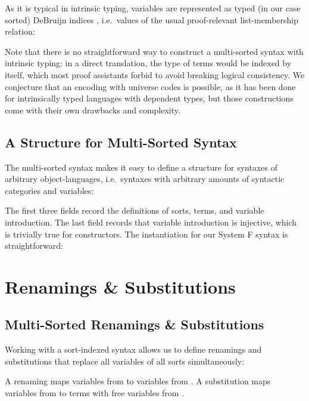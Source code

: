 \documentclass[sigplan,10pt, anonymous]{acmart}
\newenvironment{LibCode*}{%
  \begin{tcolorbox}[%
    colframe=white,%
    boxrule=0.0pt,%
    top=2.5pt,%
    left=2.5pt,%
    bottom=2.5pt,%
    right=2.5pt,%
    boxsep=0pt%
  ]\vspace{-0.2\baselineskip}%
}{%
  \vspace{-1\baselineskip}%
  \end{tcolorbox}%
}
\newenvironment{ExampleCode*}{%
  \begin{tcolorbox}[%
    colframe=white,%
    colback=yellow!5,%
    boxrule=0.0pt,%
    top=2.5pt,%
    left=2.5pt,%
    bottom=2.5pt,%
    right=2.5pt,%
    boxsep=0pt%
  ]\vspace{-0.2\baselineskip}%
}{%
  \vspace{-1\baselineskip}%
  \end{tcolorbox}%
}
\newcommand*\LibCode[1]{\begin{LibCode*}{#1}\end{LibCode*}}
\newcommand*\AppCode[1]{{#1}}
\newcommand*\ExampleCode[1]{\begin{ExampleCode*}{#1}\end{ExampleCode*}}
\newcommand*\ACode[1]{\AgdaFontStyle{\textcolor{mygray}{#1}}}
\newcommand*\AField[1]{\AgdaField{#1}}
\newcommand*\ACon[1]{\AgdaInductiveConstructor{#1}}
\newcommand*\ADef[1]{\AgdaFunction{#1}}
\begin{document}
  As it is typical in intrinsic typing, variables are represented as
  typed (in our case sorted) DeBruijn indices \ACode{S \ACon{∋} s}, i.e.\
  values of the usual proof-relevant list-membership relation:
  \LibCode\KVariables

  Note that there is no straightforward way to construct a
  multi-sorted syntax with intrinsic typing: in a direct translation,
  the type of terms \ACode{\ACon{\_⊢\_}} would be indexed by itself, which
  most proof assistants forbid to avoid breaking logical consistency.
  We conjecture that an encoding with universe codes is possible, as
  it has been done for intrinsically typed languages with dependent
  types, but those constructions come with their own drawbacks and complexity.


  \subsection{A Structure for Multi-Sorted Syntax}
  The multi-sorted syntax makes it easy to define a structure for
  syntaxes of arbitrary object-languages, i.e.\ syntaxes with
  arbitrary amounts of syntactic categories and variables:
  \LibCode\KSyntax
  The first three fields record the definitions of sorts, terms, and variable introduction.
  The last field records that variable introduction
  \ACode{\AField{`\_}} is injective, which is trivially true for
  constructors. The instantiation for our System F syntax is
  straightforward:
  \AppCode\FSyntaxInst

  \section{Renamings \& Substitutions}
  \subsection{Multi-Sorted Renamings \& Substitutions}
  Working with a sort-indexed syntax allows us to define renamings and substitutions
  that replace all variables of all sorts simultaneously:

  \ExampleCode\FExampleSubRen

  A renaming \ACode{S₁ \ADef{→ᵣ} S₂} maps variables from \ACode{S₁} to
  variables from \ACode{S₂}.
  A substitution \ACode{S₁ \ADef{→ₛ} S₂} maps variables from \ACode{S₁} to
  terms with free variables from \ACode{S₂}.
\end{document}
